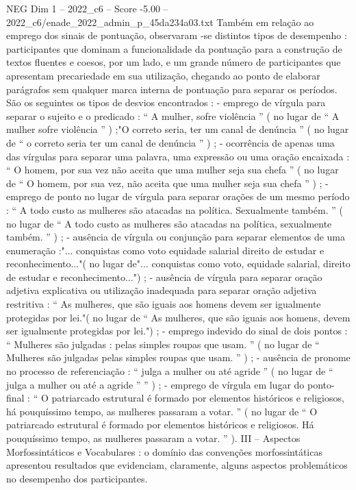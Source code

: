 \begin{textsample}{NEG Dim 1 – 2022\_c6 – Score -5.00 – 2022\_c6/enade\_2022\_admin\_p\_45da234a03.txt}
Também em relação ao emprego dos sinais de pontuação, observaram -se distintos tipos de desempenho : participantes que dominam a funcionalidade da pontuação para a construção de textos fluentes e coesos, por um lado, e um grande número de participantes que apresentam precariedade em sua utilização, chegando ao ponto de elaborar parágrafos sem qualquer marca interna de pontuação para separar os períodos.
São os seguintes os tipos de desvios encontrados : - emprego de vírgula para separar o sujeito e o predicado : “ A mulher, sofre violência ” ( no lugar de “ A mulher sofre violência ” ) ;"O correto seria, ter um canal de denúncia ” ( no lugar de “ o correto seria ter um canal de denúncia ” ) ; - ocorrência de apenas uma das vírgulas para separar uma palavra, uma expressão ou uma oração encaixada : “ O homem, por sua vez não aceita que uma mulher seja sua chefa ” ( no lugar de “ O homem, por sua vez, não aceita que uma mulher seja sua chefa ” ) ; - emprego de ponto no lugar de vírgula para separar orações de um mesmo período : “ A todo custo as mulheres são atacadas na política.
Sexualmente também. ” ( no lugar de “ A todo custo as mulheres são atacadas na política, sexualmente também. ” ) ; - ausência de vírgula ou conjunção para separar elementos de uma enumeração :"... conquistas como voto equidade salarial direito de estudar e reconhecimento..."( no lugar de"... conquistas como voto, equidade salarial, direito de estudar e reconhecimento...") ; - ausência de vírgula para separar oração adjetiva explicativa ou utilização inadequada para separar oração adjetiva restritiva : “ As mulheres, que são iguais aos homens devem ser igualmente protegidas por lei."( no lugar de “ As mulheres, que são iguais aos homens, devem ser igualmente protegidas por lei.") ; - emprego indevido do sinal de dois pontos : “ Mulheres são julgadas : pelas simples roupas que usam. ” ( no lugar de “ Mulheres são julgadas pelas simples roupas que usam. ” ) ; - ausência de pronome no processo de referenciação : “ julga a mulher ou até agride ” ( no lugar de “ julga a mulher ou até a agride ” ” ) ; - emprego de vírgula em lugar do ponto-final : “ O patriarcado estrutural é formado por elementos históricos e religiosos, há pouquíssimo tempo, as mulheres passaram a votar. ” ( no lugar de “ O patriarcado estrutural é formado por elementos históricos e religiosos.
Há pouquíssimo tempo, as mulheres passaram a votar. ” ).
III – Aspectos Morfossintáticos e Vocabulares : o domínio das convenções morfossintáticas apresentou resultados que evidenciam, claramente, alguns aspectos problemáticos no desempenho dos participantes.

\end{textsample}

